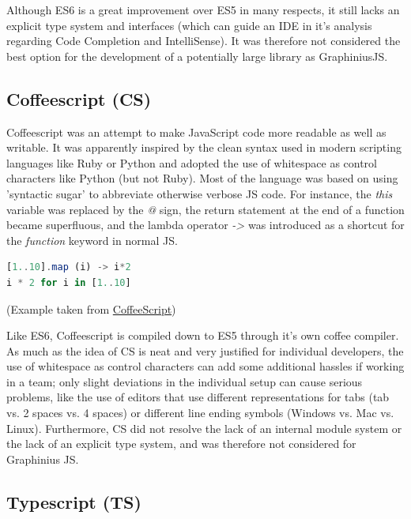 	Although ES6 is a great improvement over ES5 in many respects, it still lacks an explicit type system and interfaces (which can guide an IDE in it's analysis regarding Code Completion and IntelliSense). It was therefore not considered the best option for the development of a potentially large library as GraphiniusJS.			
	
	\subsection{Coffeescript (CS)}
	\label{ssect:coffeescript}
	
	Coffeescript was an attempt to make JavaScript code more readable as well as writable. It was apparently inspired by the clean syntax used in modern scripting languages like Ruby or Python and adopted the use of whitespace as control characters like Python (but not Ruby). Most of the language was based on using 'syntactic sugar' to abbreviate otherwise verbose JS code. For instance, the  \textit{this} variable was replaced by the  \textit{@} sign, the return statement at the end of a function became superfluous, and the lambda operator \textit{->} was introduced as a shortcut for the \textit{function} keyword in normal JS.
	
	\begin{lstlisting}[caption={Two versions of the same mapping functionality in CoffeeScript}, label={fig:Coffeescript_mapping}, language=JavaScript]
[1..10].map (i) -> i*2
i * 2 for i in [1..10]
	\end{lstlisting}
	\small
	(Example taken from \url{CoffeeScript})
	
	Like ES6, Coffeescript is compiled down to ES5 through it's own coffee compiler. As much as the idea of CS is neat and very justified for individual developers, the use of whitespace as control characters can add some additional hassles if working in a team; only slight deviations in the individual setup can cause serious problems, like the use of editors that use different representations for tabs (tab vs. 2 spaces vs. 4 spaces) or different line ending symbols (Windows vs. Mac vs. Linux). Furthermore, CS did not resolve the lack of an internal module system or the lack of an explicit type system, and was therefore not considered for Graphinius JS.
	
	
	\subsection{Typescript (TS)}
	\label{ssect:typescript}
	
